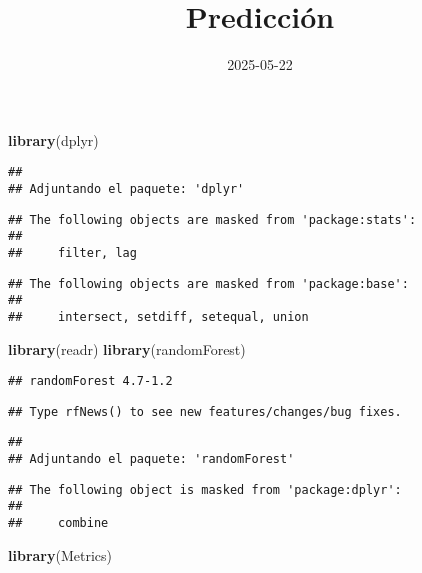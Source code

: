 \documentclass[
]{article}
\title{Predicción}
\author{}
\date{\vspace{-2.5em}2025-05-22}
\newenvironment{Shaded}{\begin{snugshade}}{\end{snugshade}}
\newcommand{\FunctionTok}[1]{\textcolor[rgb]{0.13,0.29,0.53}{\textbf{#1}}}
\newcommand{\NormalTok}[1]{#1}
\begin{document}
\maketitle

\begin{Shaded}
\begin{Highlighting}[]
\FunctionTok{library}\NormalTok{(dplyr)}
\end{Highlighting}
\end{Shaded}

\begin{verbatim}
## 
## Adjuntando el paquete: 'dplyr'
\end{verbatim}

\begin{verbatim}
## The following objects are masked from 'package:stats':
## 
##     filter, lag
\end{verbatim}

\begin{verbatim}
## The following objects are masked from 'package:base':
## 
##     intersect, setdiff, setequal, union
\end{verbatim}

\begin{Shaded}
\begin{Highlighting}[]
\FunctionTok{library}\NormalTok{(readr)}
\FunctionTok{library}\NormalTok{(randomForest)}
\end{Highlighting}
\end{Shaded}

\begin{verbatim}
## randomForest 4.7-1.2
\end{verbatim}

\begin{verbatim}
## Type rfNews() to see new features/changes/bug fixes.
\end{verbatim}

\begin{verbatim}
## 
## Adjuntando el paquete: 'randomForest'
\end{verbatim}

\begin{verbatim}
## The following object is masked from 'package:dplyr':
## 
##     combine
\end{verbatim}

\begin{Shaded}
\begin{Highlighting}[]
\FunctionTok{library}\NormalTok{(Metrics)}
\end{Highlighting}
\end{Shaded}
\end{document}
